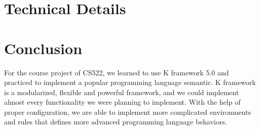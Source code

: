 \documentclass[a4paper]{article}
\begin{document}
\section{Technical Details}

\section{Conclusion}

For the course project of CS522, we learned to use K framework 5.0 and practiced to implement a popular programming language semantic. K framework is a modularized, flexible and powerful framework, and we could implement almost every functionality we were planning to implement. With the help of proper configuration, we are able to implement more complicated environments and rules that defines more advanced programming language behaviors. 
\end{document}
